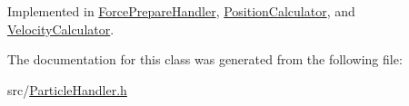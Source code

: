 Implemented in \hyperlink{classForcePrepareHandler_a06426453873836601e3addff521e00ca}{Force\-Prepare\-Handler}, \hyperlink{classPositionCalculator_a484e7688db5348d834931a555ce7aadd}{Position\-Calculator}, and \hyperlink{classVelocityCalculator_a6094f69ee291570b9ad0eae4ad1dcbf8}{Velocity\-Calculator}.



The documentation for this class was generated from the following file\-:\begin{DoxyCompactItemize}
\item 
src/\hyperlink{ParticleHandler_8h}{Particle\-Handler.\-h}\end{DoxyCompactItemize}
